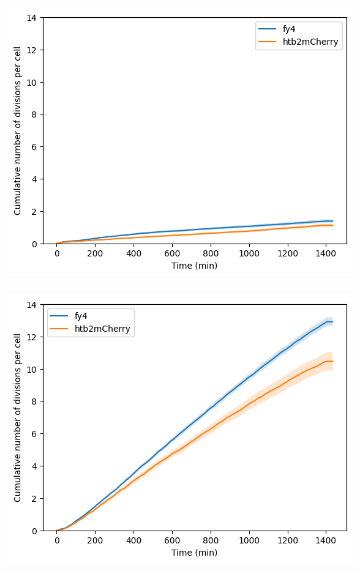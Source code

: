 \begin{figure}[htbp!]
  \begin{subfigure}[htpb]{0.45\textwidth}
   \centering
   \includegraphics[width=\textwidth]{allstrains_31492_cumul}
   \caption{
   }
   \label{fig:biology-lowglc-cumul}
  \end{subfigure}%
  \begin{subfigure}[htpb]{0.45\textwidth}
   \centering
   \includegraphics[width=\textwidth]{allstrains_26643_cumul}
   \caption{
   }
   \label{fig:biology-highglc-cumul}
  \end{subfigure}


\end{figure}
